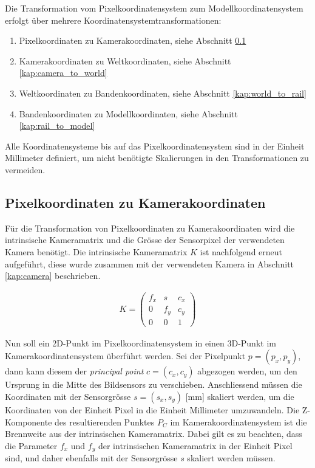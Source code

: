 Die Transformation vom Pixelkoordinatensystem zum Modellkoordinatensystem erfolgt über mehrere Koordinatensystemtransformationen:
\begin{enumerate}
  \item \label{item:transforms_pixel_to_camera} Pixelkoordinaten zu Kamerakoordinaten, siehe Abschnitt \ref{kap:pixel_to_camera}
  \item \label{item:transforms_camera_to_world} Kamerakoordinaten zu Weltkoordinaten, siehe Abschnitt \ref{kap:camera_to_world}
  \item \label{item:transforms_world_to_rail} Weltkoordinaten zu Bandenkoordinaten, siehe Abschnitt \ref{kap:world_to_rail}
  \item \label{item:transforms_rail_to_model} Bandenkoordinaten zu Modellkoordinaten, siehe Abschnitt \ref{kap:rail_to_model}
\end{enumerate}

Alle Koordinatensysteme bis auf das Pixelkoordinatensystem sind in der Einheit Millimeter definiert,
um nicht benötigte Skalierungen in den Transformationen zu vermeiden.


\subsection{Pixelkoordinaten zu Kamerakoordinaten}\label{kap:pixel_to_camera}

Für die Transformation von Pixelkoordinaten zu Kamerakoordinaten wird die intrinsische Kameramatrix und
die Grösse der Sensorpixel der verwendeten Kamera benötigt.
Die intrinsische Kameramatrix $K$ ist nachfolgend erneut aufgeführt, diese wurde zusammen mit der
verwendeten Kamera in Abschnitt \ref{kap:camera} beschrieben.

\begin{align}
K =
\begin{pmatrix}
    f_x & s   & c_x\\
    0   & f_y & c_y\\
    0   & 0   & 1
\end{pmatrix}
\end{align}

Nun soll ein 2D-Punkt im Pixelkoordinatensystem in einen 3D-Punkt im Kamerakoordinatensystem überführt werden.
Sei der Pixelpunkt $p = (p_x, p_y)$, dann kann diesem der \emph{principal point} $c = (c_x, c_y)$ abgezogen werden, um den Ursprung in
die Mitte des Bildsensors zu verschieben. Anschliessend müssen die Koordinaten mit der
Sensorgrösse $s = (s_x, s_y)$ [\si{\milli\metre}] skaliert werden, um die Koordinaten von der Einheit Pixel
in die Einheit Millimeter umzuwandeln. Die Z-Komponente des resultierenden Punktes $P_C$ im Kamerakoordinatensystem ist
die Brennweite aus der intrinsischen Kameramatrix. Dabei gilt es zu beachten, dass die Parameter $f_x$ und $f_y$ der
intrinsischen Kameramatrix in der Einheit Pixel sind, und daher ebenfalls mit der Sensorgrösse $s$ skaliert werden müssen.

